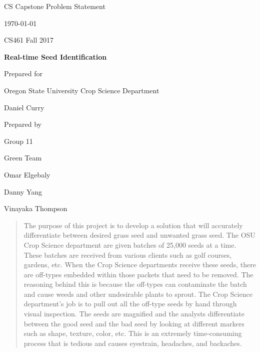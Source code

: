 \documentclass[onecolumn, draftclsnofoot,10pt, compsoc]{IEEEtran}
\def \CapstoneTeamName{			Green Team}
\def \CapstoneTeamNumber{		11}
\def \GroupMemberOne{			Omar Elgebaly}
\def \GroupMemberTwo{			Danny Yang}
\def \GroupMemberThree{			Vinayaka Thompson}
\def \CapstoneProjectName{		Real-time Seed Identification}
\def \CapstoneSponsorCompany{	Oregon State University Crop Science Department}
\def \CapstoneSponsorPerson{	Daniel Curry}
\def \DocType{		Problem Statement
				}
\newcommand{\NameSigPair}[1]{\par
\makebox[2.75in][r]{#1} \hfil 	\makebox[3.25in]{\makebox[2.25in]{\hrulefill} \hfill		\makebox[.75in]{\hrulefill}}
\par\vspace{-12pt} \textit{\tiny\noindent
\makebox[2.75in]{} \hfil		\makebox[3.25in]{\makebox[2.25in][r]{Signature} \hfill	\makebox[.75in][r]{Date}}}}
\renewcommand{\NameSigPair}[1]{#1}
\begin{document}
\begin{titlepage}
    \begin{singlespace}
        \hfill 
        \par\vspace{.2in}
        \centering
        \scshape{
            \huge CS Capstone \DocType \par
            {\large\today}\par
			{\large CS461 Fall 2017}\par
            \vspace{.5in}
            \textbf{\Huge\CapstoneProjectName}\par
            \vfill
            {\large Prepared for}\par
            \Huge \CapstoneSponsorCompany\par
            \vspace{5pt}
            {\Large\NameSigPair{\CapstoneSponsorPerson}\par}
            {\large Prepared by }\par
            Group\CapstoneTeamNumber\par
            \CapstoneTeamName\par 
            \vspace{5pt}
            {\Large
                \NameSigPair{\GroupMemberOne}\par
                \NameSigPair{\GroupMemberTwo}\par
                \NameSigPair{\GroupMemberThree}\par
            }
            \vspace{20pt}
        }
        \begin{abstract}
        	The purpose of this project is to develop a solution that will accurately differentiate between desired grass seed and unwanted grass seed. The OSU Crop Science department are given batches of 25,000 seeds at a time. These batches are received from various clients such as golf courses, gardens, etc. When the Crop Science departments receive these seeds, there are off-types embedded within those packets that need to be removed. The reasoning behind this is because the off-types can contaminate the batch and cause weeds and other undesirable plants to sprout. The Crop Science department’s job is to pull out all the off-type seeds by hand through visual inspection. The seeds are magnified and the analysts differentiate between the good seed and the bad seed by looking at different markers such as shape, texture, color, etc. This is an extremely time-consuming process that is tedious and causes eyestrain, headaches, and backaches.

\end{abstract}
\end{singlespace}
\end{titlepage}
\end{document}
